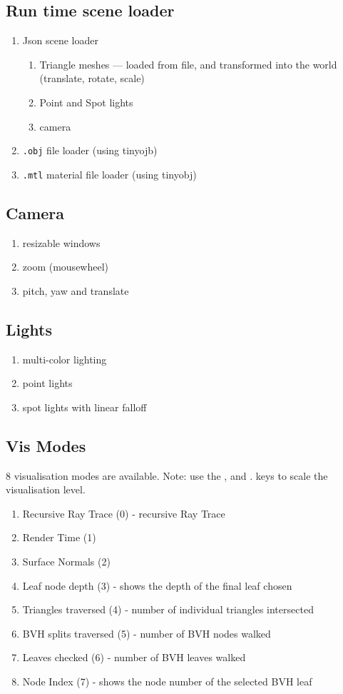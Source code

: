 \subsection{Run time scene loader}
    \begin{enumerate}
    \item Json scene loader
        \begin{enumerate}
        \item Triangle meshes --- loaded from file, and transformed into the world (translate, rotate, scale)
        \item Point and Spot lights
        \item camera
        \end{enumerate}
    \item \verb|.obj| file loader (using tinyojb)
    \item \verb|.mtl| material file loader (using tinyobj)
    \end{enumerate}

\subsection{Camera}
    \begin{enumerate}
    \item resizable windows
    \item zoom (mousewheel)
    \item pitch, yaw and translate
    \end{enumerate}

\subsection{Lights}
    \begin{enumerate}
    \item multi-color lighting
    \item point lights
    \item spot lights with linear falloff
    \end{enumerate}

\subsection{Vis Modes}
    8 visualisation modes are available. Note: use the , and . keys to scale the visualisation level.
    \begin{enumerate}
    \item Recursive Ray Trace  (0) - recursive Ray Trace
    \item Render Time (1)
    \item Surface Normals (2) 
    \item Leaf node depth (3) - shows the depth of the final leaf chosen
    \item Triangles traversed (4) - number of individual triangles intersected
    \item BVH splits traversed (5) - number of BVH nodes walked
    \item Leaves checked (6) - number of BVH leaves walked
    \item Node Index (7) - shows the node number of the selected BVH leaf
    \end{enumerate}


